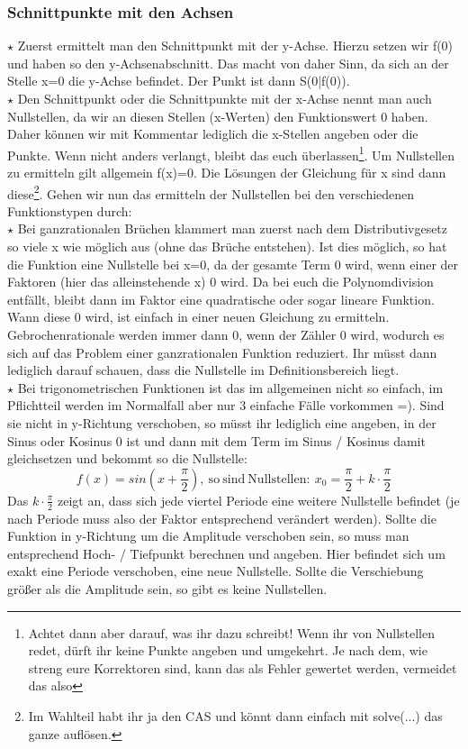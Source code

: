 \subsubsection{Schnittpunkte mit den Achsen}
\(\star\) Zuerst ermittelt man den Schnittpunkt mit der y-Achse. Hierzu setzen wir f(0) und haben so den y-Achsenabschnitt. Das macht von daher Sinn, da sich an der Stelle x=0 die y-Achse befindet. Der Punkt ist dann S(0|f(0)).\\
\(\star\) Den Schnittpunkt oder die Schnittpunkte mit der x-Achse nennt man auch Nullstellen, da wir an diesen Stellen (x-Werten) den Funktionswert 0 haben. Daher können wir mit Kommentar lediglich die x-Stellen angeben oder die Punkte. Wenn nicht anders verlangt, bleibt das euch überlassen\footnote{Achtet dann aber darauf, was ihr dazu schreibt! Wenn ihr von Nullstellen redet, dürft ihr keine Punkte angeben und umgekehrt. Je nach dem, wie streng eure Korrektoren sind, kann das als Fehler gewertet werden, vermeidet das also}. Um Nullstellen zu ermitteln gilt allgemein f(x)=0. Die Lösungen der Gleichung für x sind dann diese\footnote{Im Wahlteil habt ihr ja den CAS und könnt dann einfach mit solve(...) das ganze auflösen.}. Gehen wir nun das ermitteln der Nullstellen bei den verschiedenen Funktionstypen durch:\\
\(\star\) Bei ganzrationalen Brüchen klammert man zuerst nach dem Distributivgesetz so viele x wie möglich aus (ohne das Brüche entstehen). Ist dies möglich, so hat die Funktion eine Nullstelle bei x=0, da der gesamte Term 0 wird, wenn einer der Faktoren (hier das alleinstehende x) 0 wird. Da bei euch die Polynomdivision entfällt, bleibt dann im Faktor eine quadratische oder sogar lineare Funktion. Wann diese 0 wird, ist einfach in einer neuen Gleichung zu ermitteln. Gebrochenrationale werden immer dann 0, wenn der Zähler 0 wird, wodurch es sich auf das Problem einer ganzrationalen Funktion reduziert. Ihr müsst dann lediglich darauf schauen, dass die Nullstelle im Definitionsbereich liegt.\\
\(\star\) Bei trigonometrischen Funktionen ist das im allgemeinen nicht so einfach, im Pflichtteil werden im Normalfall aber nur 3 einfache Fälle vorkommen =). Sind sie nicht in y-Richtung verschoben, so müsst ihr lediglich eine angeben, in der Sinus oder Kosinus 0 ist und dann mit dem Term im Sinus / Kosinus damit gleichsetzen und bekommt so die Nullstelle:
\[f(x)=sin(x+\frac{\pi}{2}),\mathrm{\ so\ sind\ Nullstellen:\ }x_0=\frac{\pi}{2}+k\cdot \frac{\pi}{2}\]
Das \(k\cdot \frac{\pi}{2}\) zeigt an, dass sich jede viertel Periode eine weitere Nullstelle befindet (je nach Periode muss also der Faktor entsprechend verändert werden). Sollte die Funktion in y-Richtung um die Amplitude verschoben sein, so muss man entsprechend Hoch- / Tiefpunkt berechnen und angeben. Hier befindet sich um exakt eine Periode verschoben, eine neue Nullstelle. Sollte die Verschiebung größer als die Amplitude sein, so gibt es keine Nullstellen.
